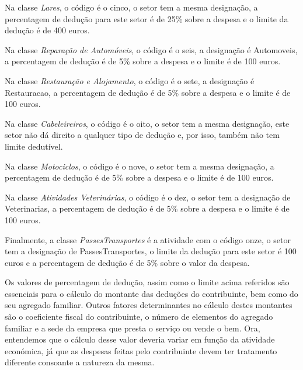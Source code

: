 \documentclass[a4paper]{article}
\begin{document}
Na classe \emph{Lares}, o código é o cinco, o setor tem a mesma
designação, a percentagem de dedução para este setor é de 25\% sobre a despesa
e o limite da dedução é de 400 euros.

\vspace{0.2cm}

Na classe \emph{Reparação de Automóveis}, o código é o seis, a
designação é Automoveis, a percentagem de dedução é de 5\% sobre a despesa e o
limite é de 100 euros.

\vspace{0.2cm}

Na classe \emph{Restauração e Alojamento}, o código é o sete, a
designação é Restauracao, a percentagem de dedução é de 5\% sobre a despesa e o
limite é de 100 euros.

\vspace{0.2cm}

Na classe \emph{Cabeleireiros}, o código é o oito, o setor tem a mesma
designação, este setor não dá direito a qualquer tipo de dedução e, por isso,
também não tem limite dedutível.

\vspace{0.2cm}

Na classe \emph{Motociclos}, o código é o nove, o setor tem a mesma
designação, a percentagem de dedução é de 5\% sobre a despesa e o
limite é de 100 euros.

\vspace{0.2cm}

Na classe \emph{Atividades Veterinárias}, o código é o dez, o setor tem a
designação de Veterinarias, a percentagem de dedução é de 5\% sobre a despesa e o
limite é de 100 euros.

\vspace{0.2cm}

Finalmente, a classe \emph{PassesTransportes} é a atividade com o código onze,
o setor tem a designação de PassesTransportes, o limite da dedução
para este setor é 100 euros e a percentagem de dedução é de 5\% sobre o valor da despesa.

\vspace{0.2cm}

Os valores de percentagem de dedução, assim como o limite acima referidos são essenciais
para o cálculo do montante das deduções do contribuinte, bem como do seu agregado
familiar. Outros fatores determinantes no cálculo destes montantes são o coeficiente
fiscal do contribuinte, o número de elementos do agregado familiar e a sede da empresa que presta
o serviço ou vende o bem.
Ora, entendemos que o cálculo desse valor deveria variar em função da atividade económica,
já que as despesas feitas pelo contribuinte devem ter tratamento diferente consoante
a natureza da mesma.\par
\end{document}
